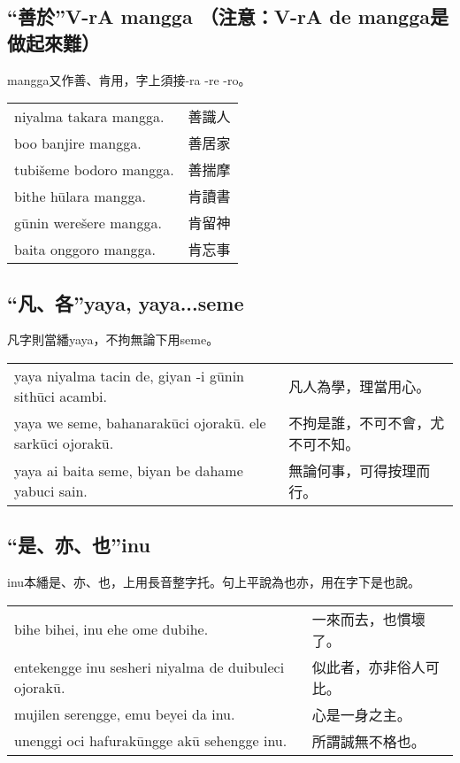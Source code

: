 \documentclass{article}
\begin{document}
\subsection{“善於”V-rA mangga （注意：V-rA de mangga是做起來難）}
\noindent mangga又作善、肯用，字上須接-ra -re -ro。
\begin{center}
    \begin{tabularx}{\textwidth}{XX}
        niyalma takara mangga. & 善識人\\
        boo banjire mangga. & 善居家\\
        tubi\v{s}eme bodoro mangga. &善揣摩\\
        bithe h\={u}lara mangga. & 肯讀書\\
        g\={u}nin were\v{s}ere mangga. & 肯留神\\
        baita onggoro mangga. & 肯忘事
    \end{tabularx}
\end{center}

\subsection{“凡、各”yaya, yaya...seme}
\noindent 凡字則當繙yaya，不拘無論下用seme。
\begin{center}
    \begin{tabularx}{\textwidth}{XX}
        yaya niyalma tacin de, giyan -i g\={u}nin sith\={u}ci acambi. & 凡人為學，理當用心。\\
        yaya we seme, bahanarak\={u}ci ojorak\={u}. ele sark\={u}ci ojorak\={u}. & 不拘是誰，不可不會，尤不可不知。\\
        yaya ai baita seme, biyan be dahame yabuci sain. & 無論何事，可得按理而行。
    \end{tabularx}
\end{center}

\subsection{“是、亦、也”inu}
\noindent inu本繙是、亦、也，上用長音整字托。句上平說為也亦，用在字下是也說。
\begin{center}
    \begin{tabularx}{\textwidth}{XX}
        bihe bihei, inu ehe ome dubihe. & 一來而去，也慣壞了。\\
        entekengge inu sesheri niyalma de duibuleci ojorak\={u}. & 似此者，亦非俗人可比。\\
        mujilen serengge, emu beyei da inu. & 心是一身之主。\\
        unenggi oci hafurak\={u}ngge ak\={u} sehengge inu. & 所謂誠無不格也。
    \end{tabularx}
\end{center}
\end{document}
